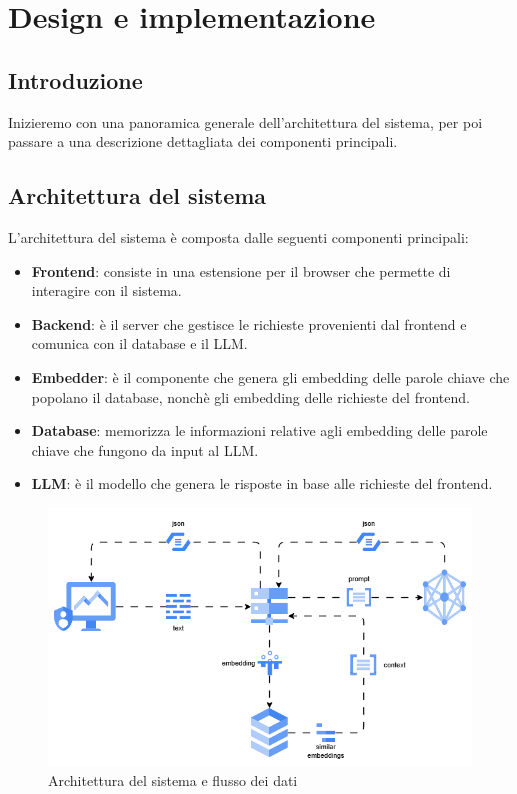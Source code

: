 \chapter{Design e implementazione}
\label{ch:sistema}

\section{Introduzione}
Inizieremo con una panoramica generale dell'architettura
del sistema, per poi passare a una descrizione dettagliata
dei componenti principali.

\section{Architettura del sistema}
\label{sec:architettura}
L'architettura del sistema è composta dalle seguenti componenti principali:

\begin{itemize}
      \item \textbf{Frontend}: consiste in una estensione per il browser che
            permette di interagire con il sistema.
      \item \textbf{Backend}: è il server che gestisce le richieste
            provenienti dal frontend e comunica con il database e il LLM.
      \item \textbf{Embedder}: è il componente che genera gli embedding
            delle parole chiave che popolano il database, nonchè gli embedding
            delle richieste del frontend.
      \item \textbf{Database}: memorizza le informazioni relative agli embedding
            delle parole chiave che fungono da input al LLM.
      \item \textbf{LLM}: è il modello che genera le risposte in base
            alle richieste del frontend.
\end{itemize}

\begin{figure}
      \centering
      \includegraphics[width=1\textwidth]{res/architecture.png}
      \caption{Architettura del sistema e flusso dei dati}
      \label{fig:architettura}
\end{figure}

